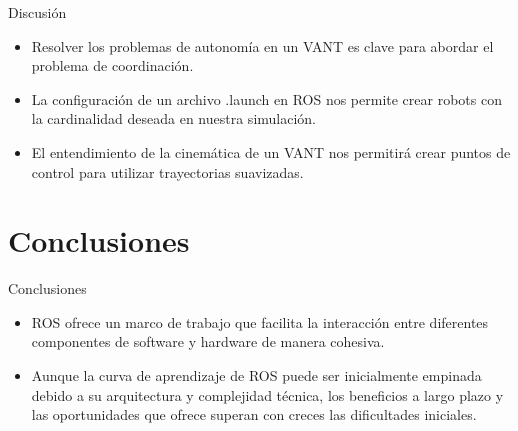 \documentclass[
  24pt, %
  aspectratio=169, %
]{beamer}
\begin{document}
\begin{frame}{Discusión}
  \begin{itemize}
  \item Resolver los problemas de autonomía en un VANT es clave para abordar el problema de coordinación.
  \item La configuración de un archivo .launch en ROS nos permite crear robots con la cardinalidad deseada en nuestra simulación.
  \item El entendimiento de la cinemática de un VANT nos permitirá crear puntos de control para utilizar trayectorias suavizadas.
  \end{itemize}
\end{frame}

\section{Conclusiones}
\begin{frame}{Conclusiones}
  \begin{itemize}
  \item ROS ofrece un marco de trabajo que facilita la interacción entre diferentes componentes de software y hardware de manera cohesiva.
  \item Aunque la curva de aprendizaje de ROS puede ser inicialmente empinada debido a su arquitectura y complejidad técnica, los beneficios a largo plazo y las oportunidades que ofrece superan con creces las dificultades iniciales.
  \end{itemize}
\end{frame}
\end{document}
